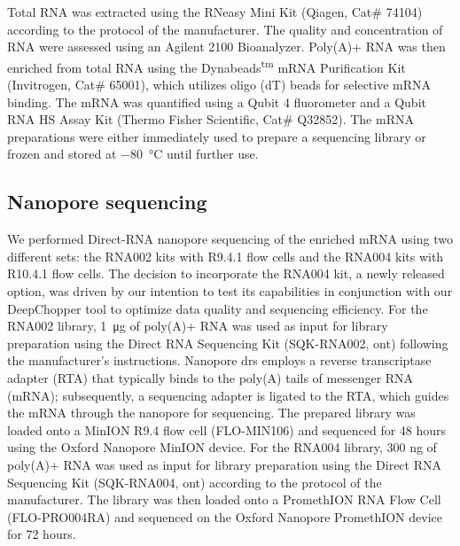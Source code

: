 \documentclass[pdflatex,sn-nature, lineno]{sn-jnl}%
\theoremstyle{thmstyleone}%
\theoremstyle{thmstyletwo}%
\theoremstyle{thmstylethree}%
\begin{document}
Total RNA was extracted using the RNeasy Mini Kit (Qiagen, Cat\# 74104) according to the protocol of the manufacturer.
The quality and concentration of RNA were assessed using an Agilent 2100 Bioanalyzer.
Poly(A)+ RNA was then enriched from total RNA using the Dynabeads\textsuperscript{tm} mRNA Purification Kit (Invitrogen, Cat\# 65001), which utilizes oligo (dT) beads for selective mRNA binding.
The mRNA was quantified using a Qubit 4 fluorometer and a Qubit RNA HS Assay Kit (Thermo Fisher Scientific, Cat\# Q32852).
The mRNA preparations were either immediately used to prepare a sequencing library or frozen and stored at \SI{-80}{\degreeCelsius} until further use.

\subsection{Nanopore sequencing}

We performed Direct-RNA nanopore sequencing of the enriched mRNA using two different sets: the RNA002 kits with R9.4.1 flow cells and the RNA004 kits with R10.4.1 flow cells.
The decision to incorporate the RNA004 kit, a newly released option, was driven by our intention to test its capabilities in conjunction with our DeepChopper tool to optimize data quality and sequencing efficiency.
For the RNA002 library, \SI{1}{\micro\gram} of poly(A)+ RNA was used as input for library preparation using the Direct RNA Sequencing Kit (SQK-RNA002, \gls{ont}) following the manufacturer's instructions.
Nanopore \gls{drs} employs a reverse transcriptase adapter (RTA) that typically binds to the poly(A) tails of messenger RNA (mRNA); subsequently, a sequencing adapter is ligated to the RTA, which guides the mRNA through the nanopore for sequencing.
The prepared library was loaded onto a MinION R9.4 flow cell (FLO-MIN106) and sequenced for 48 hours using the Oxford Nanopore MinION device.
For the RNA004 library, 300 ng of poly(A)+ RNA was used as input for library preparation using the Direct RNA Sequencing Kit (SQK-RNA004, \gls{ont}) according to the protocol of the manufacturer.
The library was then loaded onto a PromethION RNA Flow Cell (FLO-PRO004RA) and sequenced on the Oxford Nanopore PromethION device for 72 hours.
\end{document}
